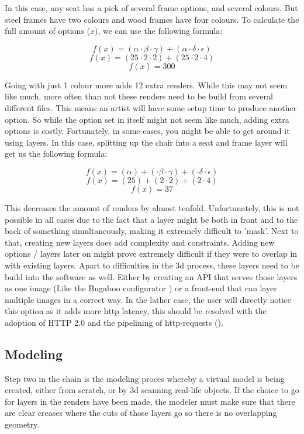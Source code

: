 In this case, any seat has a pick of several frame options, and several colours. But steel frames have two colours and wood frames have four colours. To calculate the full amount of options ($x$), we can use the following formula:
 
\[ f(x) = (\alpha \cdot \beta \cdot \gamma) + (\alpha \cdot \delta \cdot \epsilon)\]
\[ f(x) = (25 \cdot 2 \cdot 2) + (25 \cdot 2 \cdot 4)\]
\[ f(x) = 300\]

Going with just 1 colour more adds 12 extra renders. While this may not seem like much, more often than not these renders need to be build from several different files. This means an artist will have some setup time to produce another option. So while the option set in itself might not seem like much, adding extra options is costly. 
Fortunately, in some cases, you might be able to get around it using layers. In this case, splitting up the chair into a seat and frame layer will get us the following formula:

\[ f(x) = (\alpha) + (\cdot \beta \cdot \gamma) + (\cdot \delta \cdot \epsilon)\]
\[ f(x) = (25) + (2 \cdot 2) + (2 \cdot 4)\]
\[ f(x) = 37\]

This decreases the amount of renders by almost tenfold. Unfortunately, this is not possible in all cases due to the fact that a layer might be both in front and to the back of something simultaneously, making it extremely difficult to 'mask'. Next to that, creating new layers does add complexity and constraints. Adding new options / layers later on might prove extremely difficult if they were to overlap in with existing layers.
\newline
Apart to difficulties in the 3d process, these layers need to be build into the software as well. Either by creating an API that serves those layers as one image (Like the Bugaboo configurator \cite{Bugaboo} ) or a front-end that can layer multiple images in a correct way. In the lather case, the user will directly notice this option as it adds more http latency, this should be resolved with the adoption of HTTP 2.0 and the pipelining of http-requests (\cite{latency}).

\subsection{Modeling}
Step two in the chain is the modeling proces whereby a virtual model is being created, either from scratch, or by 3d scanning real-life objects. If the choice to go for layers in the renders have been made, the modeler must make sure that there are clear creases where the cuts of those layers go so there is no overlapping geometry.
